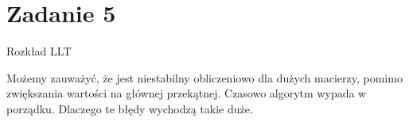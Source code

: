 \section{Zadanie 5}
Rozkład LLT 

\begin{center}
\end{center}

\noindent
Możemy zauważyć, że jest niestabilny obliczeniowo dla dużych macierzy, pomimo zwiększania wartości na głównej przekątnej. Czasowo algorytm wypada w porządku. Dlaczego te błędy wychodzą takie duże. 
